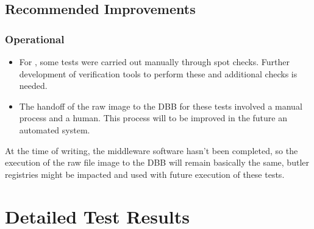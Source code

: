 \documentclass[DM,lsstdraft,STR,toc]{lsstdoc}
\begin{document}
\subsection{Recommended Improvements}
\label{sect:recommendations}

\subsubsection{Operational}

\begin{itemize}

  \item{
    For \milestoneId{}, some tests were carried out manually through spot checks.
    Further development of verification tools to perform these and additional checks is needed.
  }

  \item{
    The handoff of the raw image to the DBB for these tests involved a manual process and a human.  This process will to be improved in the future an automated system.  
  }


\end{itemize}


At the time of writing, the middleware software hasn't been completed, so the execution of the raw file image to the DBB will remain basically the same, butler registries might be impacted and used with future execution of these tests.  


\newpage

\section{Detailed Test Results}
\label{sect:detailed}
\end{document}
